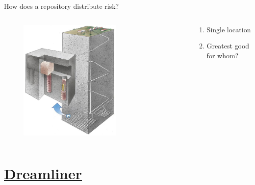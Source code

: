 \documentclass[aspectratio=1610,pdftex,dvipsnames,compress,xcolor={dvipsnames}]{beamer}
\begin{document}
\addtocounter{framenumber}{-1}
\begin{frame}{How does a repository distribute risk?}
    \begin{columns}[c]

        \begin{column}{0.65\textwidth}
            \begin{figure}
                \centering
                \includegraphics[width=0.65\textwidth]{kbs.jpg}
            \end{figure}
        \end{column}

        \begin{column}{0.35\textwidth}
            \begin{enumerate}[series=outerlist,topsep=0pt,itemsep=21pt,leftmargin=*,label=(\arabic*)]
                \item[]Single location
                \item[]Greatest good for whom?
            \end{enumerate}
        \end{column}

    \end{columns}
\end{frame}


\section{\href{https://youtu.be/rvkEpstd9os}{Dreamliner}}
\end{document}
